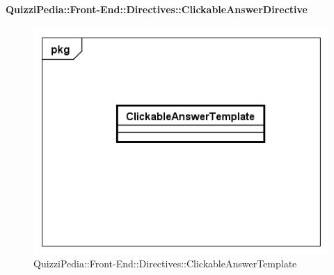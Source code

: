 	\paragraph{QuizziPedia::Front-End::Directives::ClickableAnswerDirective}
		
		\label{QuizziPedia::Front-End::Directives::ClickableAnswerDirective}
		
		\begin{figure}[ht]
			\centering
			\includegraphics[scale=0.5,keepaspectratio]{UML/Classi/Front-End/QuizziPedia_Front-end_Templates_ClickableAnswerTemplate.png}
			\caption{QuizziPedia::Front-End::Directives::ClickableAnswerTemplate}
		\end{figure} \FloatBarrier
		
